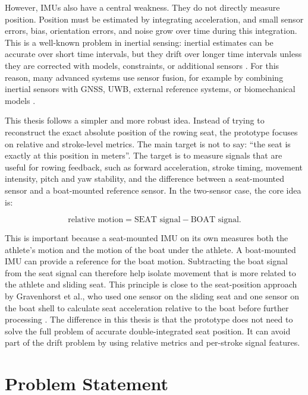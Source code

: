 However, IMUs also have a central weakness. They do not directly measure position. Position must be estimated by integrating acceleration, and small sensor errors, bias, orientation errors, and noise grow over time during this integration. This is a well-known problem in inertial sensing: inertial estimates can be accurate over short time intervals, but they drift over longer time intervals unless they are corrected with models, constraints, or additional sensors \cite{rodriguez_mendoza_wearable_2024}. For this reason, many advanced systems use sensor fusion, for example by combining inertial sensors with GNSS, UWB, external reference systems, or biomechanical models \cite{cloud_adaptive_2019,rodriguez_mendoza_wearable_2024,ruffaldi_sensor_2015}.

This thesis follows a simpler and more robust idea. Instead of trying to reconstruct the exact absolute position of the rowing seat, the prototype focuses on relative and stroke-level metrics. The main target is not to say: ``the seat is exactly at this position in meters''. The target is to measure signals that are useful for rowing feedback, such as forward acceleration, stroke timing, movement intensity, pitch and yaw stability, and the difference between a seat-mounted sensor and a boat-mounted reference sensor. In the two-sensor case, the core idea is:

\begin{equation}
  \text{relative motion} = \text{SEAT signal} - \text{BOAT signal}.
\end{equation}

This is important because a seat-mounted IMU on its own measures both the athlete's motion and the motion of the boat under the athlete. A boat-mounted IMU can provide a reference for the boat motion. Subtracting the boat signal from the seat signal can therefore help isolate movement that is more related to the athlete and sliding seat. This principle is close to the seat-position approach by Gravenhorst et al., who used one sensor on the sliding seat and one sensor on the boat shell to calculate seat acceleration relative to the boat before further processing \cite{gravenhorst_self-aligning_2012}. The difference in this thesis is that the prototype does not need to solve the full problem of accurate double-integrated seat position. It can avoid part of the drift problem by using relative metrics and per-stroke signal features.

\section{Problem Statement}

